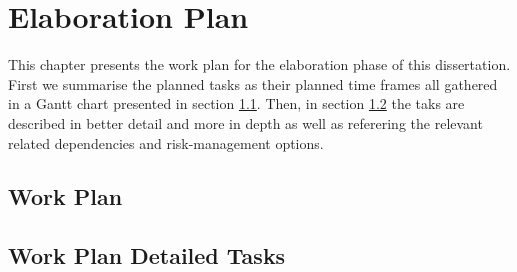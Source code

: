 \chapter{Elaboration Plan}
\label{cha:elaboration_plan}

This chapter presents the work plan for the elaboration phase of this dissertation. First we summarise the planned tasks as their planned time frames all gathered in a Gantt chart presented in section \ref{sec:workplan}. Then, in section \ref{sec:workplan_details} the taks are described in better detail and more in depth as well as referering the relevant related dependencies and risk-management options.

\section{Work Plan}
\label{sec:workplan}

\section{Work Plan Detailed Tasks}
\label{sec:workplan_details}